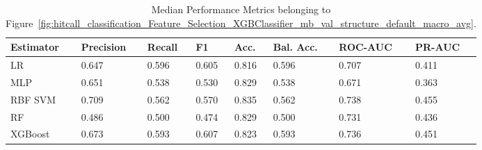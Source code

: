 \begin{longtable}{llllllll}
\caption{Median Performance Metrics belonging to Figure~\ref{fig:hitcall_classification_Feature_Selection_XGBClassifier_mb_val_structure_default_macro_avg}.}\label{tab:table:hitcall_classification_feature_selection_xgbclassifier_mb_val_structure_default_macro_avg}\\
\toprule
\midrule
\small Estimator & \small Precision & \small Recall & \small F1 & \small Acc. & \small Bal. Acc. & \small ROC-AUC & \small PR-AUC\\
\hline
LR & 0.647 & 0.596 & 0.605 & 0.816 & 0.596 & 0.707 & 0.411\\
MLP & 0.651 & 0.538 & 0.530 & 0.829 & 0.538 & 0.671 & 0.363\\
RBF SVM & 0.709 & 0.562 & 0.570 & 0.835 & 0.562 & 0.738 & 0.455\\
RF & 0.486 & 0.500 & 0.474 & 0.829 & 0.500 & 0.731 & 0.436\\
XGBoost & 0.673 & 0.593 & 0.607 & 0.823 & 0.593 & 0.736 & 0.451\\
\bottomrule
\end{longtable}